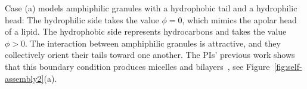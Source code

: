 Case (a) models amphiphilic granules with
a hydrophobic tail and a hydrophilic head: The hydrophilic side takes the value $\phi =0$,
which mimics the apolar head of a lipid.
The hydrophobic side
represents hydrocarbons and takes the value 
$\phi > 0$. The interaction between amphiphilic granules is attractive,
and they collectively orient their tails toward
one another. 
The PIs' previous work shows that this   
boundary condition produces micelles and
bilayers~\cite{Fu2018_SIAM}, see
Figure~\ref{fig:self-assembly2}(a).


